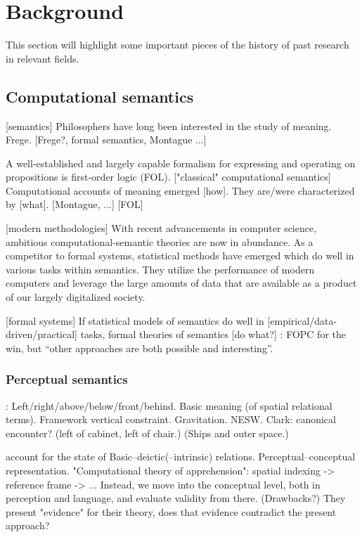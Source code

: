 \glsresetall
\section{Background}
\label{sec:background}

This section will highlight some important pieces of the history of past research in relevant fields.

\subsection{Computational semantics}

[semantics]
Philosophers have long been interested in the study of meaning.
Frege.
[Frege?, formal semantics, Montague ...]

A well-established and largely capable formalism for expressing and operating on propositions is first-order logic (FOL).
["classical" computational semantics]
Computational accounts of meaning emerged [how].
They are/were characterized by [what].
[Montague, ...]
[FOL]
\citep{BlackburnComputationalsemantics2003}


[modern methodologies]
With recent advancements in computer science, ambitious computational-semantic theories are now in abundance.
As a competitor to formal systems, statistical methods have emerged which do well in various tasks within semantics.
They utilize the performance of modern computers and leverage the large amounts of data that are available as a product of our largely digitalized society.


[formal systems]
If statistical models of semantics do well in [empirical/data-driven/practical] tasks, formal theories of semantics [do what?]
\cite{BlackburnComputationalsemantics2003}:
FOPC for the win, but ``other approaches are both possible and interesting''.





\subsubsection{Perceptual semantics}

\cite{Garnhamunifiedtheorymeaning1989}:
Left/right/above/below/front/behind.
Basic meaning (of spatial relational terms).
Framework vertical constraint.
Gravitation. NESW.
Clark: canonical encounter? (left of cabinet, left of chair.)
(Ships and outer space.)

\cite{LoganComputationalAnalysisApprehension1996} account for the state of 
Basic–deictic(–intrinsic) relations.
Perceptual–conceptual representation.
"Computational theory of apprehension": spatial indexing -> reference frame -> ... Instead, we move into the conceptual level, both in perception and language, and evaluate validity from there.
(Drawbacks?)
They present "evidence" for their theory, does that evidence contradict the present approach?

